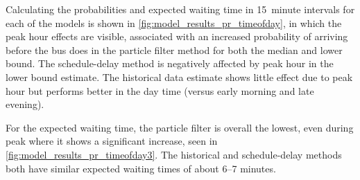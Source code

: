 Calculating the probabilities and expected waiting time in 15~minute intervals for each of the models is shown in \cref{fig:model_results_pr_timeofday}, in which the peak hour effects are visible, associated with an increased probability of arriving before the bus does in the particle filter method for both the median and lower bound. The schedule-delay method is negatively affected by peak hour in the lower bound estimate. The historical data estimate shows little effect due to peak hour but performs better in the day time (versus early morning and late evening).


For the expected waiting time, the particle filter is overall the lowest, even during peak where it shows a significant increase, seen in \cref{fig:model_results_pr_timeofday3}. The historical and schedule-delay methods both have similar expected waiting times of about 6--7 minutes.



